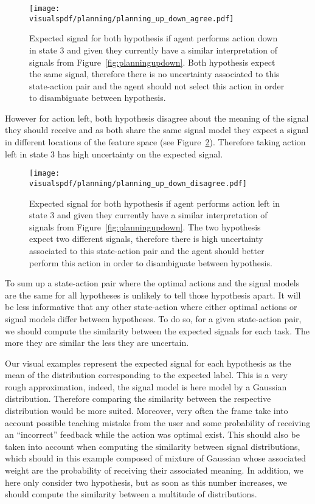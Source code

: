 \begin{figure}[!ht]
  \centering
  \texttt{[image: \\visualspdf/planning/planning\_up\_down\_agree.pdf]}
  \caption{Expected signal for both hypothesis if agent performs action down in state 3 and given they currently have a similar interpretation of signals from Figure~\ref{fig:planningupdown}. Both hypothesis expect the same signal, therefore there is no uncertainty associated to this state-action pair and the agent should not select this action in order to disambiguate between hypothesis.}
  \label{fig:uncertaintysignalupdownagree}
\end{figure}

However for action left, both hypothesis disagree about the meaning of the signal they should receive and as both share the same signal model they expect a signal in different locations of the feature space (see Figure~\ref{fig:uncertaintysignalupdowndisagree}). Therefore taking action left in state 3 has high uncertainty on the expected signal.

\begin{figure}[!ht]
  \centering
  \texttt{[image: \\visualspdf/planning/planning\_up\_down\_disagree.pdf]}
  \caption{Expected signal for both hypothesis if agent performs action left in state 3 and given they currently have a similar interpretation of signals from Figure~\ref{fig:planningupdown}. The two hypothesis expect two different signals, therefore there is high uncertainty associated to this state-action pair and the agent should better perform this action in order to disambiguate between hypothesis.}
  \label{fig:uncertaintysignalupdowndisagree}
\end{figure}


To sum up a state-action pair where the optimal actions and the signal models are the same for all hypotheses is unlikely to tell those hypothesis apart. It will be less informative that any other state-action where either optimal actions or signal models differ between hypotheses. To do so, for a given state-action pair, we should compute the similarity between the expected signals for each task. The more they are similar the less they are uncertain.

Our visual examples represent the expected signal for each hypothesis as the mean of the distribution corresponding to the expected label. This is a very rough approximation, indeed, the signal model is here model by a Gaussian distribution. Therefore comparing the similarity between the respective distribution would be more suited. Moreover, very often the frame take into account possible teaching mistake from the user and some probability of receiving an ``incorrect'' feedback while the action was optimal exist. This should also be taken into account when computing the similarity between signal distributions, which should in this example composed of mixture of Gaussian whose associated weight are the probability of receiving their associated meaning. In addition, we here only consider two hypothesis, but as soon as this number increases, we should compute the similarity between a multitude of distributions. 

